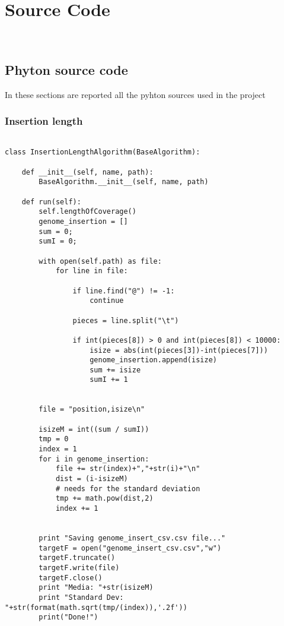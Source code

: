 
\chapter{Source Code}
\label{cap:source code}

\\

\section{Phyton source code}

In these sections are reported all the pyhton sources used in the project
\subsection{Insertion length}
\tiny
\begin{verbatim}

class InsertionLengthAlgorithm(BaseAlgorithm):

    def __init__(self, name, path):
        BaseAlgorithm.__init__(self, name, path)

    def run(self):
        self.lengthOfCoverage()
        genome_insertion = []
        sum = 0;
        sumI = 0;

        with open(self.path) as file:
            for line in file:

                if line.find("@") != -1:
                    continue

                pieces = line.split("\t")

                if int(pieces[8]) > 0 and int(pieces[8]) < 10000:
                    isize = abs(int(pieces[3])-int(pieces[7]))
                    genome_insertion.append(isize)
                    sum += isize
                    sumI += 1


        file = "position,isize\n"

        isizeM = int((sum / sumI))
        tmp = 0
        index = 1
        for i in genome_insertion:
            file += str(index)+","+str(i)+"\n"
            dist = (i-isizeM)
            # needs for the standard deviation
            tmp += math.pow(dist,2)
            index += 1


        print "Saving genome_insert_csv.csv file..."
        targetF = open("genome_insert_csv.csv","w")
        targetF.truncate()
        targetF.write(file)
        targetF.close()
        print "Media: "+str(isizeM)
        print "Standard Dev: "+str(format(math.sqrt(tmp/(index)),'.2f'))
        print("Done!")

\end{verbatim}

